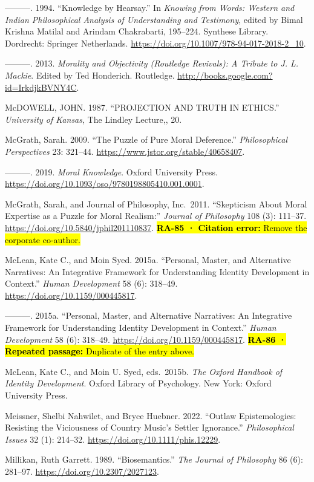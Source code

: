 \documentclass[
  letterpaper,
  DIV=11,
  numbers=noendperiod]{scrartcl}
\theoremstyle{remark}
\begin{document}
---------. 1994. ``Knowledge by Hearsay.'' In \emph{Knowing from Words:
Western and Indian Philosophical Analysis of Understanding and
Testimony}, edited by Bimal Krishna Matilal and Arindam Chakrabarti,
195--224. Synthese Library. Dordrecht: Springer Netherlands.
\url{https://doi.org/10.1007/978-94-017-2018-2_10}.

---------. 2013. \emph{Morality and Objectivity (Routledge Revivals): A
Tribute to J. L. Mackie}. Edited by Ted Honderich. Routledge.
\url{http://books.google.com?id=IrkdjkBVNY4C}.

McDOWELL, JOHN. 1987. ``PROJECTION AND TRUTH IN ETHICS.''
\emph{University of Kansas}, The Lindley Lecture,, 20.

McGrath, Sarah. 2009. ``The Puzzle of Pure Moral Deference.''
\emph{Philosophical Perspectives} 23: 321--44.
\url{https://www.jstor.org/stable/40658407}.

---------. 2019. \emph{Moral Knowledge}. Oxford University Press.
\url{https://doi.org/10.1093/oso/9780198805410.001.0001}.

McGrath, Sarah, and Journal of Philosophy, Inc.~2011. ``Skepticism About
Moral Expertise as a Puzzle for Moral Realism:'' \emph{Journal of
Philosophy} 108 (3): 111--37.
\url{https://doi.org/10.5840/jphil201110837}. \hl{\textbf{RA-85 ·
Citation error:} Remove the corporate co-author.}

McLean, Kate C., and Moin Syed. 2015a. ``Personal, Master, and
Alternative Narratives: An Integrative Framework for Understanding
Identity Development in Context.'' \emph{Human Development} 58 (6):
318--49. \url{https://doi.org/10.1159/000445817}.

---------. 2015a. ``Personal, Master, and Alternative Narratives: An
Integrative Framework for Understanding Identity Development in
Context.'' \emph{Human Development} 58 (6): 318--49.
\url{https://doi.org/10.1159/000445817}. \hl{\textbf{RA-86 · Repeated
passage:} Duplicate of the entry above.}

McLean, Kate C., and Moin U. Syed, eds.~2015b. \emph{The Oxford Handbook
of Identity Development}. Oxford Library of Psychology. New York: Oxford
University Press.

Meissner, Shelbi Nahwilet, and Bryce Huebner. 2022. ``Outlaw
Epistemologies: Resisting the Viciousness of Country Music's Settler
Ignorance.'' \emph{Philosophical Issues} 32 (1): 214--32.
\url{https://doi.org/10.1111/phis.12229}.

Millikan, Ruth Garrett. 1989. ``Biosemantics.'' \emph{The Journal of
Philosophy} 86 (6): 281--97. \url{https://doi.org/10.2307/2027123}.
\end{document}

